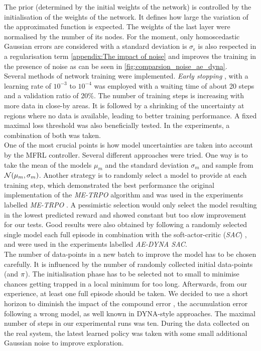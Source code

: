 \documentclass[
reprint,
amsmath,amssymb,amsfonts,clevref,
aps,
prstab,
]{revtex4-2}
\begin{document}
The prior (determined by the initial weights of the network) is controlled by the initialisation of the weights of the network. It defines how large the variation of the approximated function is expected. The weights of the last layer were normalised by the number of its nodes. For the moment, only homoscedastic Gaussian errors are considered with a standard deviation is $\sigma_\epsilon$ is also respected in a regularisation term \cref{appendix:The impact of noise} and improves the training in the presence of noise as can be seen in \cref{fig:comparsion_noise_ae_dyna}. \\
Several methods of network training were implemented. \emph{Early stopping} \cite{Goodfellow2016}, with a learning rate of $10^{-3}$ to $10^{-4}$  was employed  with a waiting time of about 20 steps and a validation ratio of 20\%. The number of training steps is increasing with more data in close-by areas. It is followed by a shrinking of the uncertainty at regions where no data is available, leading to better training performance. A fixed maximal loss threshold was also beneficially tested. In the experiments, a combination of both was taken.\\
One of the most crucial points is how model uncertainties are taken into account by the MFRL controller. Several different approaches were tried. One way is to take the mean of the models $\mu_m$ and the standard deviation $\sigma_m$ and sample from $\mathcal{N}(\mu_m,\sigma_m)$. Another strategy is to randomly select a model to provide at each training step, which demonstrated the best performance the original implementation of the \emph{ME-TRPO} algorithm and was used in the experiments labelled \emph{ME-TRPO} \cite{Kurutach2018}. A pessimistic selection would only select the model resulting in the lowest predicted reward and showed constant but too slow improvement for our tests.
Good results were also obtained by following a randomly selected single model each full episode in combination with the soft-actor-critic (\emph{SAC}) \cite{fujimoto2018addressing,Hill2018}, and were used in the experiments labelled \emph{AE-DYNA SAC}. \\
The number of data-points in a new batch to improve the model has to be chosen carefully. It is influenced by the number of randomly collected initial data-points (and $\pi$). The initialisation phase has to be selected not to small to minimise chances getting trapped in a local minimum for too long. Afterwards, from our experience, at least one full episode should be taken. We decided to use a short horizon to diminish the impact of the compound error \cite{Janner2019}, the accumulation error following a wrong model, as well known in DYNA-style approaches. The maximal number of steps in our experimental runs was ten. During the data collected on the real system, the latest learned policy was taken with some small additional Gaussian noise to improve exploration.\\
\end{document}
